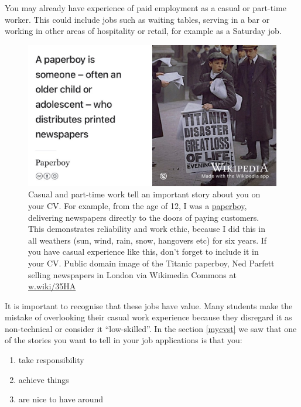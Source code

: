 \documentclass[
]{book}
\providecommand{\tightlist}{%
  \setlength{\itemsep}{0pt}\setlength{\parskip}{0pt}}
\begin{document}
You may already have experience of paid employment as a casual or part-time worker. This could include jobs such as waiting tables, serving in a bar or working in other areas of hospitality or retail, for example as a Saturday job.

\begin{figure}

{\centering \includegraphics[width=0.99\linewidth]{images/Titanic-paperboy-crop} 

}

\caption{Casual and part-time work tell an important story about you on your CV. For example, from the age of 12, I was a \href{https://en.wikipedia.org/wiki/Paperboy}{paperboy}, delivering newspapers directly to the doors of paying customers. This demonstrates reliability and work ethic, because I did this in all weathers (sun, wind, rain, snow, hangovers etc) for six years. If you have casual experience like this, don't forget to include it in your CV. Public domain image of the Titanic paperboy, Ned Parfett selling newspapers in London via Wikimedia Commons at \href{https://w.wiki/35HA}{w.wiki/35HA}}\label{fig:paperboy-fig}
\end{figure}



It is important to recognise that these jobs have value. Many students make the mistake of overlooking their casual work experience because they disregard it as non-technical or consider it ``low-skilled''. In the section \ref{mycvst} we saw that one of the stories you want to tell in your job applications is that you:

\begin{enumerate}
\def\labelenumi{\arabic{enumi}.}
\tightlist
\item
  take responsibility
\item
  achieve things
\item
  are nice to have around
\end{enumerate}
\end{document}
